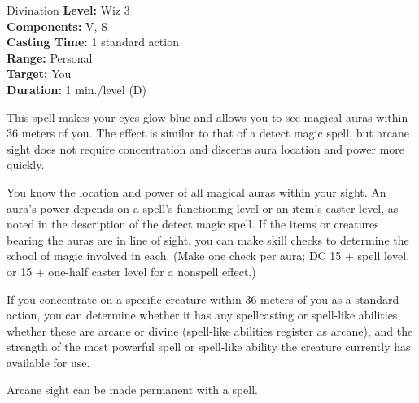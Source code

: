 {Divination}
{
	\textbf{Level:}
	Wiz 3\\
	\textbf{Components:}
	V, S\\
	\textbf{Casting Time:}
	1 standard action\\
	\textbf{Range:}
	Personal\\
	\textbf{Target:}
	You\\
	\textbf{Duration:}
	1 min./level (D)\\
}
{
	This spell makes your eyes glow blue and allows you to see magical auras within 36 meters of you. The effect is similar to that of a detect magic spell, but arcane sight does not require concentration and discerns aura location and power more quickly.

	You know the location and power of all magical auras within your sight. An aura's power depends on a spell's functioning level or an item's caster level, as noted in the description of the detect magic spell. If the items or creatures bearing the auras are in line of sight, you can make  skill checks to determine the school of magic involved in each. (Make one check per aura; DC 15 + spell level, or 15 + one-half caster level for a nonspell effect.)

	If you concentrate on a specific creature within 36 meters of you as a standard action, you can determine whether it has any spellcasting or spell-like abilities, whether these are arcane or divine (spell-like abilities register as arcane), and the strength of the most powerful spell or spell-like ability the creature currently has available for use.

	Arcane sight can be made permanent with a  spell.

}
